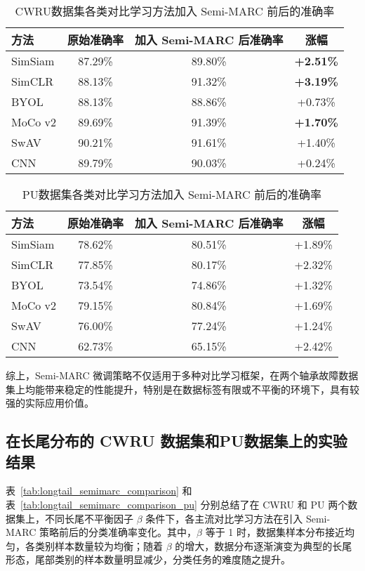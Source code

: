 \documentclass[master]{thesis-uestc}
\begin{document}
\begin{table}[h]
    \centering
    \caption{CWRU数据集各类对比学习方法加入 Semi-MARC 前后的准确率}
    \renewcommand\arraystretch{1.2}
    \begin{tabular}{lccc}
        \toprule
        方法 & 原始准确率 & 加入 Semi-MARC 后准确率 & 涨幅 \\
        \midrule
        SimSiam & 87.29\% & 89.80\% & \textbf{+2.51\%} \\
        SimCLR  & 88.13\% & 91.32\% & \textbf{+3.19\%} \\
        BYOL    & 88.13\% & 88.86\% & +0.73\% \\
        MoCo v2 & 89.69\% & 91.39\% & \textbf{+1.70\%} \\
        SwAV    & 90.21\% & 91.61\% & +1.40\% \\
        CNN     & 89.79\% & 90.03\% & +0.24\% \\
        \bottomrule
    \end{tabular}
    \label{tab:semimarc_improvement}
\end{table}

\begin{table}[h]
    \centering
    \caption{PU数据集各类对比学习方法加入 Semi-MARC 前后的准确率}
    \renewcommand\arraystretch{1.2}
    \begin{tabular}{lccc}
        \toprule
        方法 & 原始准确率 & 加入 Semi-MARC 后准确率 & 涨幅 \\
        \midrule
        SimSiam & 78.62\% & 80.51\% & +1.89\% \\
        SimCLR  & 77.85\% & 80.17\% & +2.32\% \\
        BYOL    & 73.54\% & 74.86\% & +1.32\% \\
        MoCo v2 & 79.15\% & 80.84\% & +1.69\% \\
        SwAV    & 76.00\% & 77.24\% & +1.24\% \\
        CNN     & 62.73\% & 65.15\% & +2.42\% \\
        \bottomrule
    \end{tabular}
    \label{tab:semimarc_improvement_pu}
\end{table}


综上，Semi-MARC 微调策略不仅适用于多种对比学习框架，在两个轴承故障数据集上均能带来稳定的性能提升，特别是在数据标签有限或不平衡的环境下，具有较强的实际应用价值。

\subsection{在长尾分布的 CWRU 数据集和PU数据集上的实验结果}
表~\ref{tab:longtail_semimarc_comparison} 和表~\ref{tab:longtail_semimarc_comparison_pu} 分别总结了在 CWRU 和 PU 两个数据集上，不同长尾不平衡因子 $\beta$ 条件下，各主流对比学习方法在引入 Semi-MARC 策略前后的分类准确率变化。其中，$\beta$ 等于 1 时，数据集样本分布接近均匀，各类别样本数量较为均衡；随着 $\beta$ 的增大，数据分布逐渐演变为典型的长尾形态，尾部类别的样本数量明显减少，分类任务的难度随之提升。
\end{document}
